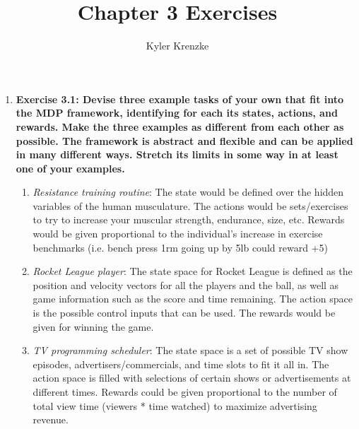 \documentclass[11pt]{article}
\title{Chapter 3 Exercises}
\author{Kyler Krenzke}
\date{}
\begin{document}
	\maketitle
	
	\begin{enumerate}
	
		\item \textbf{Exercise 3.1: Devise three example tasks of your own that fit into the MDP framework, identifying for each its states, actions, and rewards. Make the three
		examples as different from each other as possible. The framework is abstract and flexible and can be applied in many different ways. Stretch its limits in some way in at
		least one of your examples.}
		
		\begin{enumerate}
			
			\item \textit{Resistance training routine}: The state would be defined over the hidden variables of the human musculature. The actions would be sets/exercises to try
			to increase your muscular strength, endurance, size, etc. Rewards would be given proportional to the individual's increase in exercise benchmarks (i.e. bench press 1rm
			going up by 5lb could reward +5)
			
			\item \textit{Rocket League player}: The state space for Rocket League is defined as the position and velocity vectors for all the players and the ball, as well as
			game information such as the score and time remaining. The action space is the possible control inputs that can be used. The rewards would be given for winning the
			game.
			
			\item \textit{TV programming scheduler}: The state space is a set of possible TV show episodes, advertisers/commercials, and time slots to fit it all in. The action
			space is filled with selections of certain shows or advertisements at different times. Rewards could be given proportional to the number of total view time (viewers *
			time watched) to maximize advertising revenue.
			
		\end{enumerate}
	
	\end{enumerate}
\end{document}
